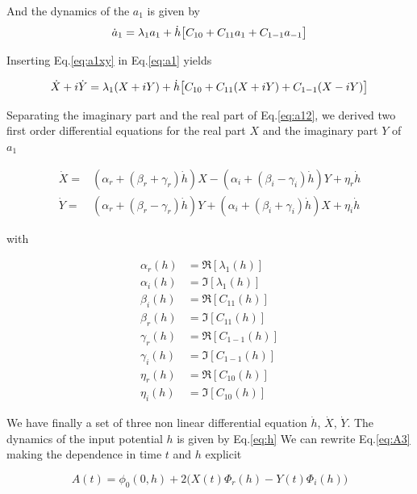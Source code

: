 \documentclass[12pt,twoside]{report}
\begin{document}
And the dynamics of the $a_1$ is given by
\begin{equation}
\label{eq:a1}
\dot{a}_1=\lambda_1 a_1 + \dot{h}\big[C_{10}+C_{11}a_1+C_{1-1}a_{-1}\big]\\
\end{equation}


Inserting Eq.\eqref{eq:a1xy} in Eq.\eqref{eq:a1} yields


\begin{equation}
\label{eq:a12}
\dot{X}+i\dot{Y}=\lambda_1(X + iY)+ \dot{h}\big[C_{10}+C_{11}(X + iY)+C_{1-1}(X - iY)\big]\\
\end{equation}


Separating the imaginary part and the real part of Eq.\eqref{eq:a12}, we derived two first order differential equations for the real part $X$ and the imaginary part $Y$ of $a_{1}$

\begin{align}
\label{eq:X}
\dot{X}=&\left(\alpha_r+ (\beta_r+ \gamma_r)\dot{h}\right)X-\left(\alpha_i+ (\beta_i- \gamma_i)\dot{h}\right)Y +\eta_r\dot{h}\\
\label{eq:Y}
\dot{Y}=&\left(\alpha_r+ (\beta_r- \gamma_r)\dot{h}\right)Y+\left(\alpha_i+(\beta_i+ \gamma_i)\dot{h}\right)X +\eta_i\dot{h}
\end{align}

with

\begin{align}
\label{eq:first}
\alpha_r(h)&=\Re[\lambda_1(h)]\\
\alpha_i(h)&=\Im[\lambda_1(h)]\\
\beta_i(h)&=\Re[C_{11}(h)]\\
\beta_r(h)&=\Im[C_{11}(h)]\\
\gamma_r(h)&=\Re[C_{1-1}(h)]\\
\gamma_i(h)&=\Im[C_{1-1}(h)]\\
\eta_r(h)&=\Re[C_{10}(h)]\\
\label{eq:last}
\eta_i(h)&=\Im[C_{10}(h)]	
\end{align}


We have finally a set of three non linear differential equation $\dot{h}$, $\dot{X}$, $\dot{Y}$. The dynamics of the input potential $h$ is given by Eq.\eqref{eq:h}
We can rewrite Eq.\eqref{eq:A3} making the dependence in time $t$ and $h$ explicit

\begin{equation}
\label{eq:A4}
A(t)=\phi_0(0,h) + 2\big(X(t)\Phi_r(h)- Y(t)\Phi_i(h)\big)
\end{equation}
\end{document}
